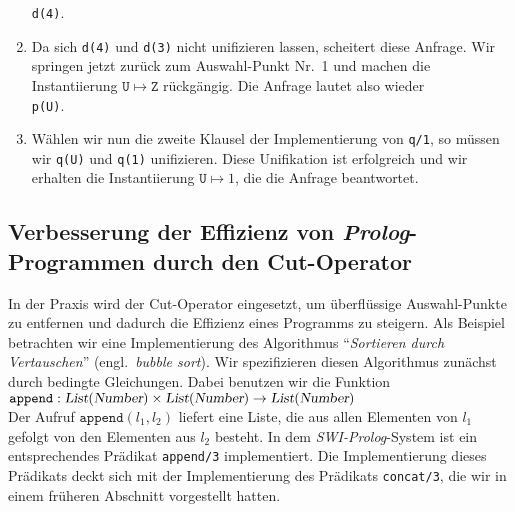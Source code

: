 \begin{enumerate}
      \hspace*{1.3cm} \texttt{d(4)}.
\item Da sich \texttt{d(4)} und \texttt{d(3)} nicht unifizieren lassen,
      scheitert diese Anfrage.  Wir springen jetzt zur\"{u}ck zum Auswahl-Punkt Nr.~1 und
      machen die Instantiierung $\mathtt{U} \mapsto \mathtt{Z}$ r\"{u}ckg\"{a}ngig.  Die Anfrage
      lautet also wieder \\[0.1cm]
      \hspace*{1.3cm} \texttt{p(U)}.
\item W\"{a}hlen wir nun die zweite Klausel der Implementierung von \texttt{q/1},
      so m\"{u}ssen wir \texttt{q(U)} und \texttt{q(1)} unifizieren.  Diese Unifikation ist
      erfolgreich und wir erhalten die Instantiierung $\mathtt{U} \mapsto 1$, die die Anfrage beantwortet.
\end{enumerate}

\subsection{Verbesserung der Effizienz von \textsl{Prolog}-Programmen durch den Cut-Operator}
In der Praxis wird der Cut-Operator eingesetzt, um \"{u}berfl\"{u}ssige Auswahl-Punkte zu
entfernen und dadurch die Effizienz eines Programms zu steigern.  Als Beispiel
betrachten wir eine Implementierung des Algorithmus 
``\emph{Sortieren durch Vertauschen}'' (engl.~\emph{bubble sort}).
Wir spezifizieren diesen Algorithmus zun\"{a}chst durch bedingte Gleichungen.  Dabei 
benutzen wir die Funktion \\[0.1cm]
\hspace*{1.3cm} 
$\texttt{append}: \textsl{List}(\textsl{Number}) \times \textsl{List}(\textsl{Number}) \rightarrow \textsl{List}(\textsl{Number})$
\\[0.1cm]
Der Aufruf $\texttt{append}(l_1, l_2)$ liefert eine Liste, die aus allen Elementen von
$l_1$ gefolgt von den Elementen aus $l_2$ besteht.  In dem \textsl{SWI-Prolog}-System ist
ein entsprechendes Pr\"{a}dikat \texttt{append/3} implementiert.  Die Implementierung dieses
Pr\"{a}dikats deckt sich mit der Implementierung des Pr\"{a}dikats \texttt{concat/3}, die wir in
einem fr\"{u}heren Abschnitt vorgestellt hatten.  

